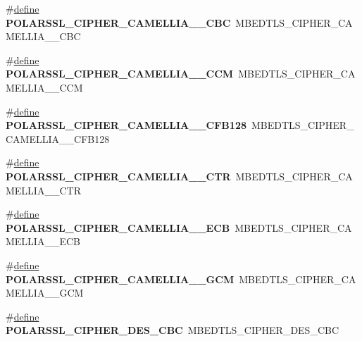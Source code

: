 \begin{DoxyCompactItemize}
\#\hyperlink{structdefine}{define} {\bfseries P\+O\+L\+A\+R\+S\+S\+L\+\_\+\+C\+I\+P\+H\+E\+R\+\_\+\+C\+A\+M\+E\+L\+L\+I\+A\+\_\+\_\+\+C\+BC}~M\+B\+E\+D\+T\+L\+S\+\_\+\+C\+I\+P\+H\+E\+R\+\_\+\+C\+A\+M\+E\+L\+L\+I\+A\+\_\+\_\+\+C\+BC
\item 
\mbox{\label{compat-1_83_8h_ad3cf51fb1456a122ac2afac30c6af043}} 
\#\hyperlink{structdefine}{define} {\bfseries P\+O\+L\+A\+R\+S\+S\+L\+\_\+\+C\+I\+P\+H\+E\+R\+\_\+\+C\+A\+M\+E\+L\+L\+I\+A\+\_\+\_\+\+C\+CM}~M\+B\+E\+D\+T\+L\+S\+\_\+\+C\+I\+P\+H\+E\+R\+\_\+\+C\+A\+M\+E\+L\+L\+I\+A\+\_\+\_\+\+C\+CM
\item 
\mbox{\label{compat-1_83_8h_a55fd6fbf27aca1fe483315fa11694b21}} 
\#\hyperlink{structdefine}{define} {\bfseries P\+O\+L\+A\+R\+S\+S\+L\+\_\+\+C\+I\+P\+H\+E\+R\+\_\+\+C\+A\+M\+E\+L\+L\+I\+A\+\_\+\_\+\+C\+F\+B128}~M\+B\+E\+D\+T\+L\+S\+\_\+\+C\+I\+P\+H\+E\+R\+\_\+\+C\+A\+M\+E\+L\+L\+I\+A\+\_\+\_\+\+C\+F\+B128
\item 
\mbox{\label{compat-1_83_8h_aad37f9736f8e91521fb4680d340d6c18}} 
\#\hyperlink{structdefine}{define} {\bfseries P\+O\+L\+A\+R\+S\+S\+L\+\_\+\+C\+I\+P\+H\+E\+R\+\_\+\+C\+A\+M\+E\+L\+L\+I\+A\+\_\+\_\+\+C\+TR}~M\+B\+E\+D\+T\+L\+S\+\_\+\+C\+I\+P\+H\+E\+R\+\_\+\+C\+A\+M\+E\+L\+L\+I\+A\+\_\+\_\+\+C\+TR
\item 
\mbox{\label{compat-1_83_8h_a5275cbe624da0de915170896de8d1139}} 
\#\hyperlink{structdefine}{define} {\bfseries P\+O\+L\+A\+R\+S\+S\+L\+\_\+\+C\+I\+P\+H\+E\+R\+\_\+\+C\+A\+M\+E\+L\+L\+I\+A\+\_\+\_\+\+E\+CB}~M\+B\+E\+D\+T\+L\+S\+\_\+\+C\+I\+P\+H\+E\+R\+\_\+\+C\+A\+M\+E\+L\+L\+I\+A\+\_\+\_\+\+E\+CB
\item 
\mbox{\label{compat-1_83_8h_a05e01137a6eabf79ebd047c6681e0362}} 
\#\hyperlink{structdefine}{define} {\bfseries P\+O\+L\+A\+R\+S\+S\+L\+\_\+\+C\+I\+P\+H\+E\+R\+\_\+\+C\+A\+M\+E\+L\+L\+I\+A\+\_\+\_\+\+G\+CM}~M\+B\+E\+D\+T\+L\+S\+\_\+\+C\+I\+P\+H\+E\+R\+\_\+\+C\+A\+M\+E\+L\+L\+I\+A\+\_\+\_\+\+G\+CM
\item 
\mbox{\label{compat-1_83_8h_a46037026b6211c370e465876ad9f7350}} 
\#\hyperlink{structdefine}{define} {\bfseries P\+O\+L\+A\+R\+S\+S\+L\+\_\+\+C\+I\+P\+H\+E\+R\+\_\+\+D\+E\+S\+\_\+\+C\+BC}~M\+B\+E\+D\+T\+L\+S\+\_\+\+C\+I\+P\+H\+E\+R\+\_\+\+D\+E\+S\+\_\+\+C\+BC

\end{DoxyCompactItemize}

